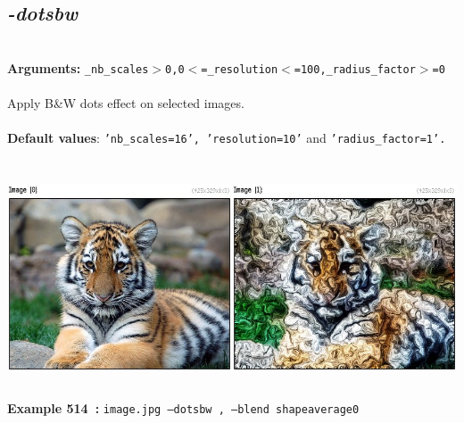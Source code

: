 \documentclass[a4paper,11pt,twoside]{book}
\begin{document}
\subsection{\emph{-dotsbw} }\vspace*{-0.5em}
~\\\textbf{Arguments: } 
{\small \texttt{\_nb\_scales$>$0,0$<$=\_resolution$<$=100,\_radius\_factor$>$=0}}\\~\\
Apply B\&W dots effect on selected images.
~\\~\\\textbf{Default values}: {\small \texttt{'nb\_scales=16', 'resolution=10'} and \texttt{'radius\_factor=1'.}}
\begin{center}\includegraphics[keepaspectratio=true,height=7cm,width=\textwidth]{img/gmic_def514.jpg}\\
{\footnotesize \textbf{Example 514~:} \texttt{image.jpg --dotsbw , --blend shapeaverage0}}
\end{center}
\end{document}
